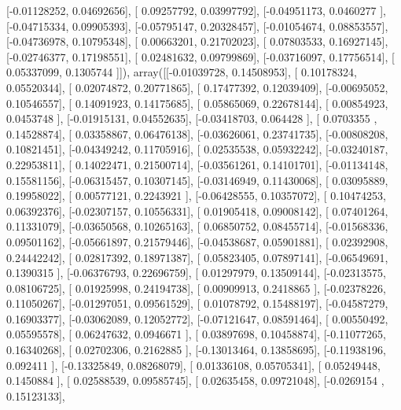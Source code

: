 \documentclass{article}
\begin{document}
       [-0.01128252,  0.04692656],
       [ 0.09257792,  0.03997792],
       [-0.04951173,  0.0460277 ],
       [-0.04715334,  0.09905393],
       [-0.05795147,  0.20328457],
       [-0.01054674,  0.08853557],
       [-0.04736978,  0.10795348],
       [ 0.00663201,  0.21702023],
       [ 0.07803533,  0.16927145],
       [-0.02746377,  0.17198551],
       [ 0.02481632,  0.09799869],
       [-0.03716097,  0.17756514],
       [ 0.05337099,  0.1305744 ]]), array([[-0.01039728,  0.14508953],
       [ 0.10178324,  0.05520344],
       [ 0.02074872,  0.20771865],
       [ 0.17477392,  0.12039409],
       [-0.00695052,  0.10546557],
       [ 0.14091923,  0.14175685],
       [ 0.05865069,  0.22678144],
       [ 0.00854923,  0.0453748 ],
       [-0.01915131,  0.04552635],
       [-0.03418703,  0.064428  ],
       [ 0.0703355 ,  0.14528874],
       [ 0.03358867,  0.06476138],
       [-0.03626061,  0.23741735],
       [-0.00808208,  0.10821451],
       [-0.04349242,  0.11705916],
       [ 0.02535538,  0.05932242],
       [-0.03240187,  0.22953811],
       [ 0.14022471,  0.21500714],
       [-0.03561261,  0.14101701],
       [-0.01134148,  0.15581156],
       [-0.06315457,  0.10307145],
       [-0.03146949,  0.11430068],
       [ 0.03095889,  0.19958022],
       [ 0.00577121,  0.2243921 ],
       [-0.06428555,  0.10357072],
       [ 0.10474253,  0.06392376],
       [-0.02307157,  0.10556331],
       [ 0.01905418,  0.09008142],
       [ 0.07401264,  0.11331079],
       [-0.03650568,  0.10265163],
       [ 0.06850752,  0.08455714],
       [-0.01568336,  0.09501162],
       [-0.05661897,  0.21579446],
       [-0.04538687,  0.05901881],
       [ 0.02392908,  0.24442242],
       [ 0.02817392,  0.18971387],
       [ 0.05823405,  0.07897141],
       [-0.06549691,  0.1390315 ],
       [-0.06376793,  0.22696759],
       [ 0.01297979,  0.13509144],
       [-0.02313575,  0.08106725],
       [ 0.01925998,  0.24194738],
       [ 0.00909913,  0.2418865 ],
       [-0.02378226,  0.11050267],
       [-0.01297051,  0.09561529],
       [ 0.01078792,  0.15488197],
       [-0.04587279,  0.16903377],
       [-0.03062089,  0.12052772],
       [-0.07121647,  0.08591464],
       [ 0.00550492,  0.05595578],
       [ 0.06247632,  0.0946671 ],
       [ 0.03897698,  0.10458874],
       [-0.11077265,  0.16340268],
       [ 0.02702306,  0.2162885 ],
       [-0.13013464,  0.13858695],
       [-0.11938196,  0.092411  ],
       [-0.13325849,  0.08268079],
       [ 0.01336108,  0.05705341],
       [ 0.05249448,  0.1450884 ],
       [ 0.02588539,  0.09585745],
       [ 0.02635458,  0.09721048],
       [-0.0269154 ,  0.15123133],
\end{document}
